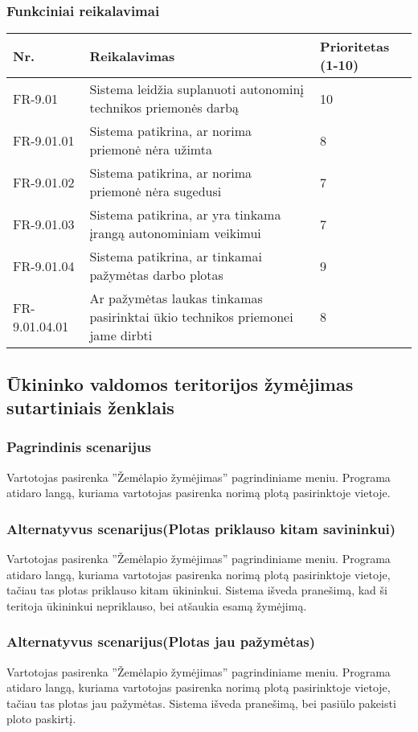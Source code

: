 \documentclass[oneside]{VUMIFPSkursinis}
\begin{document}
\subsubsection{Funkciniai reikalavimai}
\begin{table}[htbp]
	\begin{tabularx}{1\textwidth}{ |P{2.5cm}|X|P{3cm }| }  \hline
    Nr. & Reikalavimas &  Prioritetas (1-10)  \\   \hline 
    FR-9.01 & Sistema leidžia suplanuoti autonominį technikos priemonės darbą & 10  \\   \hline
		FR-9.01.01 & Sistema patikrina, ar norima priemonė nėra užimta & 8  \\ \hline
		FR-9.01.02 & Sistema patikrina, ar norima priemonė nėra sugedusi & 7 \\ \hline
		FR-9.01.03 & Sistema patikrina, ar yra tinkama įrangą autonominiam veikimui & 7 \\  \hline
		FR-9.01.04 & Sistema patikrina, ar tinkamai pažymėtas darbo plotas & 9  \\ \hline
	FR-9.01.04.01 & Ar pažymėtas laukas tinkamas pasirinktai ūkio technikos priemonei jame dirbti & 8 \\ \hline
	\end{tabularx}
\end{table}

\subsection{Ūkininko valdomos teritorijos žymėjimas sutartiniais ženklais}
	\subsubsection{Pagrindinis scenarijus}
	Vartotojas pasirenka ''Žemėlapio žymėjimas'' pagrindiniame meniu. Programa atidaro langą, kuriama vartotojas pasirenka norimą plotą pasirinktoje vietoje.
	\subsubsection{Alternatyvus scenarijus(Plotas priklauso kitam savininkui)}
	Vartotojas pasirenka ''Žemėlapio žymėjimas'' pagrindiniame meniu. Programa atidaro langą, kuriama vartotojas pasirenka norimą plotą pasirinktoje vietoje, tačiau tas plotas priklauso kitam ūkininkui. Sistema išveda pranešimą, kad ši teritoja ūkininkui nepriklauso, bei atšaukia esamą žymėjimą.
	\subsubsection{Alternatyvus scenarijus(Plotas jau pažymėtas)}
	Vartotojas pasirenka ''Žemėlapio žymėjimas'' pagrindiniame meniu. Programa atidaro langą, kuriama vartotojas pasirenka norimą plotą pasirinktoje vietoje, tačiau tas plotas jau pažymėtas. Sistema išveda pranešimą, bei pasiūlo pakeisti ploto paskirtį.
\end{document}
